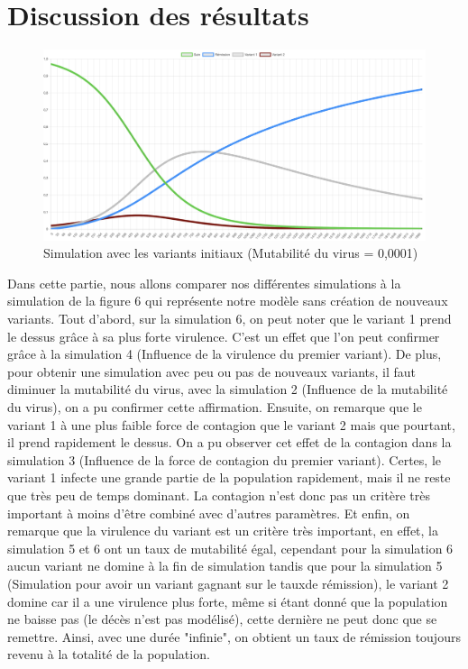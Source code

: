 \documentclass{article}
\begin{document}
\section{Discussion des résultats}

\begin{figure}[h]
    \includegraphics[width=\linewidth]{images/Simulation6.png}
    \caption{Simulation avec les variants initiaux (Mutabilité du virus = 0,0001)}
    \label{fig:simulation6}
\end{figure}


Dans cette partie, nous allons comparer nos différentes simulations à la simulation de la figure 6 qui représente notre modèle sans création de nouveaux variants. Tout d'abord, sur la simulation 6, on peut noter que le variant 1 prend le dessus grâce à sa plus forte virulence. C'est un effet que l'on peut confirmer grâce à la simulation 4 (Influence de la virulence du premier variant). De plus, pour obtenir une simulation avec peu ou pas de nouveaux variants, il faut diminuer la mutabilité du virus, avec la simulation 2 (Influence de la mutabilité du virus), on a pu confirmer cette affirmation. Ensuite, on remarque que le variant 1 à une plus faible force de contagion que le variant 2 mais que pourtant, il prend rapidement le dessus. On a pu observer cet effet de la contagion dans la simulation 3 (Influence de la force de contagion du premier variant). Certes, le variant 1 infecte une grande partie de la population rapidement, mais il ne reste que très peu de temps dominant. La contagion n'est donc pas un critère très important à moins d'être combiné avec d'autres paramètres. Et enfin, on remarque que la virulence du variant est un critère très important, en effet, la simulation 5 et 6 ont un taux de mutabilité égal, cependant pour la simulation 6 aucun variant ne domine à la fin de simulation tandis que pour la simulation 5 (Simulation pour avoir un variant gagnant sur le tauxde rémission), le variant 2 domine car il a une virulence plus forte, même si étant donné que la population ne baisse pas (le décès n'est pas modélisé), cette dernière ne peut donc que se remettre. Ainsi, avec une durée "infinie", on obtient un taux de rémission toujours revenu à la totalité de la population. \\
\end{document}
